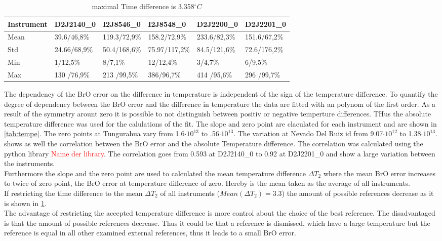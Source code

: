 \documentclass  [
  paper    = a4,
  BCOR     = 10mm,
  twoside,
  fontsize = 12pt,
  fleqn,
  toc      = bibnumbered,
  toc      = listofnumbered,
  numbers  = noendperiod,
  headings = normal,
  listof   = leveldown,
  version  = 3.03
]                                       {scrreprt}
\begin{document}
	\begin{table}
	\begin{tabular}{|p{2cm}|p{2cm}|p{2cm}|p{2cm}|p{2cm}|p{2cm}|}
		Instrument	&D2J2140\_0&I2J8546\_0& I2J8548\_0&D2J2200\_0&D2J2201\_0\\
		\toprule
		Mean&
		39.6/46,8\%&
		119.3/72,9\%
		&158.2/72,9\%
		&233.6/82,3\%
		&151.6/67,2\%\\
		\midrule
		Std&
		24.66/68,9\%&
		50.4/168,6\%&
		75.97/117,2\%&
		84.5/121,6\%&
		72.6/176,2\%\\
		\midrule
		Min&
		1/12,5\%
		&8/7,1\%&
		12/12,4\%&
		3/4,7\% &
		6/9,5\%\\
		\midrule
		Max
		&
		130	/76,9\%&
		213	/99,5\%&
		386/96,7\%&
		414	/95,6\% &
		296	/99,7\%\\
		\bottomrule
	\end{tabular}
	\caption{maximal Time difference is 3.358$^{\circ}C$}
	\label{tab:decTemp}
	\end{table}	
The dependency of the BrO error on the difference in temperature is independent of the sign of the temperature difference. To quantify the degree of dependency between the BrO error and the difference in temperature the data are fitted with an polynom of the first order. As a result of the symmetry arount zero it is possible to not distinguish between positiv or negative temperture differences. THus the absolute temperature difference was used for the calulations of the fit. The slope and zero point are claculated for each instrument and are shown in \cref{tab:tempe}. 
The zero points at Tungurahua vary from 1.6$\cdot10^{13}$ to .56$\cdot10^{13}$. The variation at Nevado Del Ruiz id from  9.07$\cdot10^{12}$ to 1.38$\cdot10^{13}$.\\
 shows as well the correlation between the BrO error and the absolute Temperature difference.
The correlation was calculated using the python library \textcolor{red}{Name der library}. The correlation goes from 0.593 at D2J2140\_0 to  0.92 at D2J2201\_0 and show a large variation between the instruments.\\
Furthermore the slope and the zero point are used to calculated the mean temperature difference $\Delta T_{2}$ where the mean BrO error increases to twice of zero point, the BrO error at temperature difference of zero.
Hereby is the mean taken as the average of all instruments.\\
If restricting the time difference to the mean $\Delta T_{2}$ of all instruments
($Mean(\Delta T_{2}) = 3.3$) the amount of possible references decrease as it is shown in \cref{tab:decTemp}.\\
The advantage of restricting the accepted temperature difference is more control about the choice of the best reference. The disadvantaged is that the amount of possible references decrease. Thus it could be that a reference is dismissed, which have a large temperature but the reference is equal in all other examined external references, thus it leads to a small BrO error.\\
\end{document}
